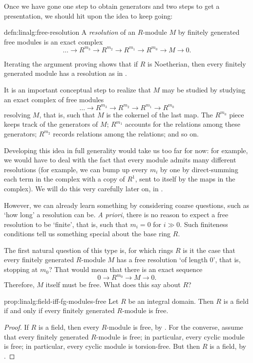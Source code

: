 Once we have gone one step to obtain generators and two steps to get a
presentation, we should hit upon the idea to keep going:
\begin{defn}{}{defn:linalg:free-resolution}
  A \emph{resolution} of an $R$-module $M$ by finitely generated free
  modules is an exact complex
  \[
    \dots \to R^{m_3} \to R^{m_2} \to R^{m_1} \to R^{m_0} \to M \to 0.
  \]
\end{defn}
Iterating the argument proving  shows that if $R$ is
Noetherian, then every finitely generated module has a resolution as
in .

It is an important conceptual step to realize that $M$ may be studied
by studying an exact complex of free modules
\[
  \dots \to R^{m_3} \to R^{m_2} \to R^{m_1} \to R^{m_0}
\]
resolving $M$, that is, such that $M$ is the cokernel of the last map.
The $R^{m_0}$ piece keeps track of the generators of $M$; $R^{m_1}$
accounts for the relations among these generators; $R^{m_2}$ records
relations among the relations; and so on.

Developing this idea in full generality would take us too far for now:
for example, we would have to deal with the fact that every module
admits many different resolutions (for example, we can bump up every
$m_i$ by one by direct-summing each term in the complex with a copy of
$R^1$, sent to itself by the maps in the complex). We will do this
very carefully later on, in .

However, we can already learn something by considering coarse
questions, such as `how long' a resolution can be. \emph{A priori},
there is no reason to expect a free resolution to be `finite', that
is, such that $m_i = 0$ for $i \gg 0$. Such finiteness conditions tell
us something special about the base ring $R$.

The first natural question of this type is, for which rings $R$ is it
the case that every finitely generated $R$-module $M$ has a free
resolution `of length 0', that is, stopping at $m_0$? That would mean
that there is an exact sequence
\[
  0 \to R^{m_0} \to M \to 0.
\]
Therefore, $M$ itself must be free. What does this say about $R$?

\begin{prop}{}{prop:linalg:field-iff-fg-modules-free}
  Let $R$ be an integral domain. Then $R$ is a field if and only if
  every finitely generated $R$-module is free.
\end{prop}
\begin{proof}
  If $R$ is a field, then every $R$-module is free, by
  .  For the converse, assume that every finitely
  generated $R$-module is free; in particular, every cyclic module is
  free; in particular, every cyclic module is torsion-free. But then
  $R$ is a field, by .
\end{proof}

